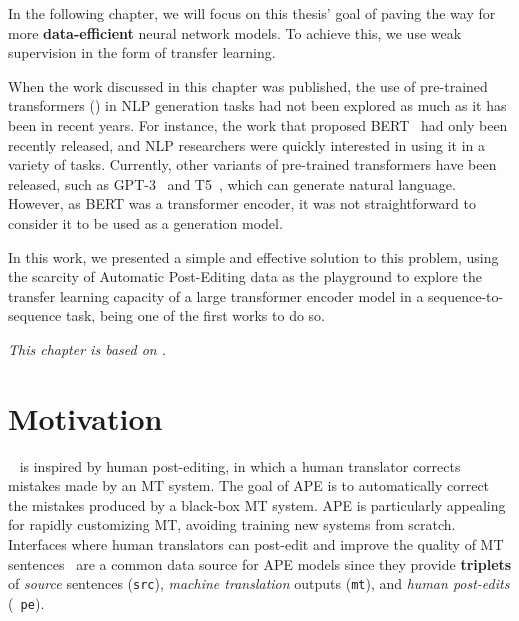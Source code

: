 \label{chap:ape}

\cleardoublepage
\doublespacing

\noindent In the following chapter, we will focus on this thesis' goal of
paving the way for more \textbf{data-efficient} neural network
models. To achieve this, we use weak supervision in the form of
transfer learning.

When the work discussed in this chapter was published, the use of
pre-trained transformers () in NLP
generation tasks had not been explored as much as it has been in
recent years. For instance, the work that proposed
BERT~\citep{devlin2018bert} had only been recently released, and NLP
researchers were quickly interested in using it in a variety of
tasks. Currently, other variants of pre-trained transformers have
been released, such as GPT-3~\citep{brown2020language} and
T5~\citep{raffel2020Exploringlimitstransfer}, which can generate
natural language. However, as BERT was a transformer encoder, it was
not straightforward to consider it to be used as a generation model.

In this work, we presented a simple and effective solution to this
problem, using the scarcity of Automatic Post-Editing data as the
playground to explore the transfer learning capacity of a large
transformer encoder model in a sequence-to-sequence task, being one
of the first works to do so.

\emph{This chapter is based on \citet*{Correia2019}.}

\section{Motivation}

~\citep[APE;][]{simard2007rule} is
inspired by human post-editing, in which a human translator corrects
mistakes made by an MT system.
The goal of APE is to automatically correct the mistakes produced by
a black-box MT system. APE is particularly
appealing for rapidly customizing MT, avoiding training new systems
from scratch. Interfaces where human translators can post-edit and
improve the quality of MT
sentences~\citep{Alabau2014,Federico2014,Denkowski2015,Hokamp2018}
are a common data source for APE models since they provide {\bf
        triplets} of {\it source} sentences ({\tt src}), {\it machine
        translation} outputs ({\tt mt}), and {\it human post-edits} ({\tt
        pe}).

